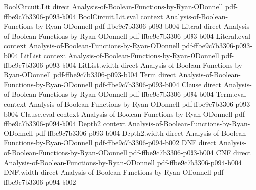 \begin{theorem}
\leanok
{}
\proofstep
  {BoolCircuit.Lit}
  {direct}
  {Analysis-of-Boolean-Functions-by-Ryan-ODonnell}
  {pdf-ffbe9c7b3306-p093-b004}
\proofstep
  {BoolCircuit.Lit.eval}
  {context}
  {Analysis-of-Boolean-Functions-by-Ryan-ODonnell}
  {pdf-ffbe9c7b3306-p093-b004}
\proofstep
  {Literal}
  {direct}
  {Analysis-of-Boolean-Functions-by-Ryan-ODonnell}
  {pdf-ffbe9c7b3306-p093-b004}
\proofstep
  {Literal.eval}
  {context}
  {Analysis-of-Boolean-Functions-by-Ryan-ODonnell}
  {pdf-ffbe9c7b3306-p093-b004}
\proofstep
  {LitList}
  {context}
  {Analysis-of-Boolean-Functions-by-Ryan-ODonnell}
  {pdf-ffbe9c7b3306-p093-b004}
\proofstep
  {LitList.width}
  {direct}
  {Analysis-of-Boolean-Functions-by-Ryan-ODonnell}
  {pdf-ffbe9c7b3306-p093-b004}
\proofstep
  {Term}
  {direct}
  {Analysis-of-Boolean-Functions-by-Ryan-ODonnell}
  {pdf-ffbe9c7b3306-p093-b004}
\proofstep
  {Clause}
  {direct}
  {Analysis-of-Boolean-Functions-by-Ryan-ODonnell}
  {pdf-ffbe9c7b3306-p094-b004}
\proofstep
  {Term.eval}
  {context}
  {Analysis-of-Boolean-Functions-by-Ryan-ODonnell}
  {pdf-ffbe9c7b3306-p093-b004}
\proofstep
  {Clause.eval}
  {context}
  {Analysis-of-Boolean-Functions-by-Ryan-ODonnell}
  {pdf-ffbe9c7b3306-p094-b004}
\proofstep
  {Depth2}
  {context}
  {Analysis-of-Boolean-Functions-by-Ryan-ODonnell}
  {pdf-ffbe9c7b3306-p093-b004}
\proofstep
  {Depth2.width}
  {direct}
  {Analysis-of-Boolean-Functions-by-Ryan-ODonnell}
  {pdf-ffbe9c7b3306-p094-b002}
\proofstep
  {DNF}
  {direct}
  {Analysis-of-Boolean-Functions-by-Ryan-ODonnell}
  {pdf-ffbe9c7b3306-p093-b004}
\proofstep
  {CNF}
  {direct}
  {Analysis-of-Boolean-Functions-by-Ryan-ODonnell}
  {pdf-ffbe9c7b3306-p094-b004}
\proofstep
  {DNF.width}
  {direct}
  {Analysis-of-Boolean-Functions-by-Ryan-ODonnell}
  {pdf-ffbe9c7b3306-p094-b002}

\end{theorem}
